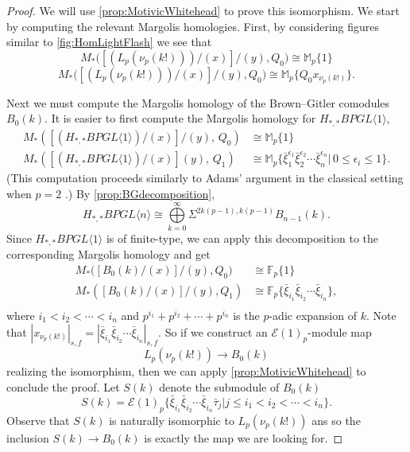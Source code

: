 \documentclass{amsart}
\theoremstyle{plain}
\numberwithin{theorem}{section}
\numberwithin{equation}{section}
\numberwithin{figure}{section}
\newcommand{\mF}{{\mathbb F}}
\newcommand{\cE}{{\mathcal E}}
\newcommand{\0}{\langle 0 \rangle }
\begin{document}
\begin{proof}
    We will use \cref{prop:MotivicWhitehead} to prove this isomorphism. We start by computing the relevant Margolis homologies. First, by considering figures similar to \cref{fig:HomLightFlash} we see that
    \[
    M_* \big([(L_p(\nu_p (k!)))/(x)]/(y), Q_0\big) \cong \mathbb{M}_p \{1\}
    \]
    \[
    M_* \big([(L_p(\nu_p (k!)))/(x)]/(y), Q_0\big) \cong \mathbb{M}_p \{Q_0 x_{\nu_p(k!)} \}.
    \]

    Next we must compute the Margolis homology of the Brown--Gitler comodules $B_0(k)$. It is easier to first compute the Margolis homology for $H_{*,*} BPGL \langle 1 \rangle$, 
    \begin{align*}
        M_*\left(\left[\left(H_{*,*} BPGL \langle 1 \rangle\right)/\left(x\right)\right]/\left(y\right), \, Q_0 \right) & \cong \mathbb{M}_p \{1  \} \\
        M_* \left([(H_{*,*} BPGL \langle 1 \rangle)/(x)](y), \, Q_1 \right) & \cong \mathbb{M}_p \{ \bar{\xi}_1^{\epsilon_1} \bar{\xi}_2^{\epsilon_2} \cdots \bar{\xi}_n^{\epsilon_n} | \, 0 \leq \epsilon_i \leq 1 \}.
    \end{align*}
    (This computation proceeds similarly to Adams' argument in the classical setting when $p = 2$ \cite[ Lemma 16.9]{Adams74}.)
    By \cref{prop:BGdecomposition}, 
    \[
    H_{*,*}BPGL\langle n \rangle \cong \bigoplus\limits_{k=0}^{\infty} \Sigma^{2k(p-1),k(p-1)} B_{n-1}(k).
    \]
    Since $H_{*,*} BPGL \langle 1 \rangle$ is of finite-type, we can apply this decomposition to the corresponding Margolis homology and get
    \begin{align*}
        M_* \big([B_0(k)/(x)]/ (y) , Q_0 \big) & \cong \mF_p \{1\} \\
        M_* \left([B_0(k)/(x)]/ (y) , Q_1 \right) & \cong \mF_p \{\bar{\xi}_{i_1} \bar{\xi}_{i_2} \cdots \bar{\xi}_{i_n} \}, \\ 
    \end{align*}
    where $i_1 < i_2 < \cdots < i_n$ and $p^{i_1} + p^{i_2} + \cdots + p^{i_n}$ is the $p$-adic expansion of $k$. 
    Note that $|x_{\nu_p(k!)}|_{s,f} = | \bar{\xi}_{i_1} \bar{\xi}_{i_2} \cdots \bar{\xi}_{i_n} |_{s,f}$. So if we construct an $\cE(1)_p$-module map
    \[
    L_p(\nu_p(k!)) \to B_0(k)
    \]
    realizing the isomorphism, then we can apply \cref{prop:MotivicWhitehead} to conclude the proof. Let $S(k)$ denote the submodule of $B_0(k)$
    \[
    S(k) = \cE(1)_p \{\bar{\xi}_{i_1} \bar{\xi}_{i_2} \cdots \bar{\xi}_{i_n} \bar{\tau}_j | j \leq i_1 < i_2 < \cdots < i_n \}.
    \]
    Observe that $S(k)$ is naturally isomorphic to $L_p(\nu_p(k!))$ ans so the inclusion $S(k) \to B_0(k)$ is exactly the map we are looking for. 
\end{proof}
\end{document}
